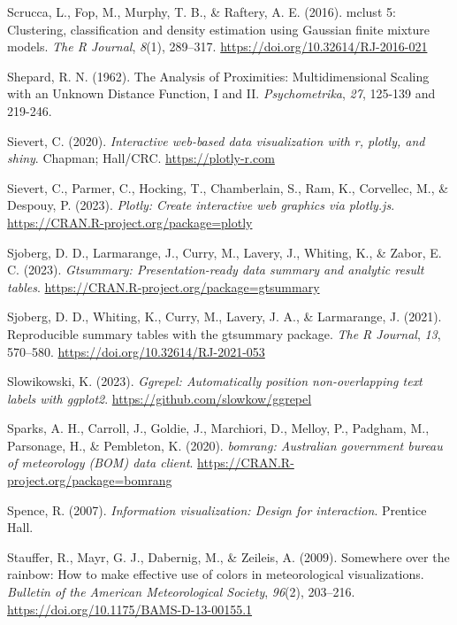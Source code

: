 \documentclass[
  letterpaper,
]{krantz}
\newlength{\cslhangindent}
\newenvironment{CSLReferences}[2] %
 {\begin{list}{}{%
  \setlength{\itemindent}{0pt}
  \setlength{\leftmargin}{0pt}
  \setlength{\parsep}{0pt}
  \ifodd #1
   \setlength{\leftmargin}{\cslhangindent}
   \setlength{\itemindent}{-1\cslhangindent}
  \fi
  \setlength{\itemsep}{#2\baselineskip}}}
 {\end{list}}
\begin{document}
\begin{CSLReferences}{1}{0}
Scrucca, L., Fop, M., Murphy, T. B., \& Raftery, A. E. (2016). {mclust}
5: Clustering, classification and density estimation using {G}aussian
finite mixture models. \emph{The {R} Journal}, \emph{8}(1), 289--317.
\url{https://doi.org/10.32614/RJ-2016-021}

Shepard, R. N. (1962). The {A}nalysis of {P}roximities:
{M}ultidimensional {S}caling with an {U}nknown {D}istance {F}unction,
{I} and {II}. \emph{Psychometrika}, \emph{27}, 125-139 and 219-246.

Sievert, C. (2020). \emph{Interactive web-based data visualization with
r, plotly, and shiny}. Chapman; Hall/CRC. \url{https://plotly-r.com}

Sievert, C., Parmer, C., Hocking, T., Chamberlain, S., Ram, K.,
Corvellec, M., \& Despouy, P. (2023). \emph{Plotly: Create interactive
web graphics via plotly.js}.
\url{https://CRAN.R-project.org/package=plotly}

Sjoberg, D. D., Larmarange, J., Curry, M., Lavery, J., Whiting, K., \&
Zabor, E. C. (2023). \emph{Gtsummary: Presentation-ready data summary
and analytic result tables}.
\url{https://CRAN.R-project.org/package=gtsummary}

Sjoberg, D. D., Whiting, K., Curry, M., Lavery, J. A., \& Larmarange, J.
(2021). Reproducible summary tables with the gtsummary package.
\emph{{The R Journal}}, \emph{13}, 570--580.
\url{https://doi.org/10.32614/RJ-2021-053}

Slowikowski, K. (2023). \emph{Ggrepel: Automatically position
non-overlapping text labels with ggplot2}.
\url{https://github.com/slowkow/ggrepel}

Sparks, A. H., Carroll, J., Goldie, J., Marchiori, D., Melloy, P.,
Padgham, M., Parsonage, H., \& Pembleton, K. (2020). \emph{{bomrang}:
Australian government bureau of meteorology (BOM) data client}.
\url{https://CRAN.R-project.org/package=bomrang}

Spence, R. (2007). \emph{Information visualization: Design for
interaction}. Prentice Hall.

Stauffer, R., Mayr, G. J., Dabernig, M., \& Zeileis, A. (2009).
Somewhere over the rainbow: How to make effective use of colors in
meteorological visualizations. \emph{Bulletin of the American
Meteorological Society}, \emph{96}(2), 203--216.
\url{https://doi.org/10.1175/BAMS-D-13-00155.1}


\end{CSLReferences}
\end{document}
